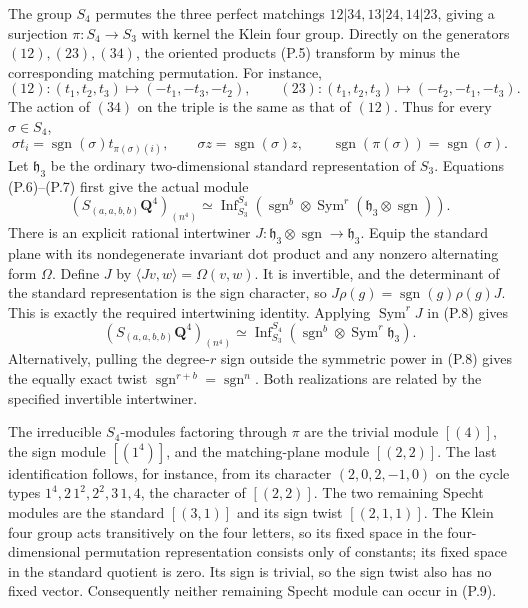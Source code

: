 \documentclass[
  10pt,
]{article}
\begin{document}
The group \(S_4\) permutes the three perfect matchings
\(12|34,13|24,14|23\), giving a surjection \(\pi:S_4\to S_3\) with
kernel the Klein four group. Directly on the generators
\((12),(23),(34)\), the oriented products (P.5) transform by minus the
corresponding matching permutation. For instance, \[
(12):(t_1,t_2,t_3)\longmapsto(-t_1,-t_3,-t_2),
\qquad
(23):(t_1,t_2,t_3)\longmapsto(-t_2,-t_1,-t_3).
\] The action of \((34)\) on the triple is the same as that of \((12)\).
Thus for every \(\sigma\in S_4\), \[
\sigma t_i=\operatorname{sgn}(\sigma)t_{\pi(\sigma)(i)},
\qquad \sigma z=\operatorname{sgn}(\sigma)z,
\qquad\operatorname{sgn}(\pi(\sigma))=\operatorname{sgn}(\sigma).
\tag{P.7}
\] Let \(\mathfrak h_3\) be the ordinary two-dimensional standard
representation of \(S_3\). Equations (P.6)--(P.7) first give the actual
module \[
(S_{(a,a,b,b)}\mathbf Q^4)_{(n^4)}
\simeq\operatorname{Inf}_{S_3}^{S_4}
\left(\operatorname{sgn}^{b}\otimes
\operatorname{Sym}^{r}(\mathfrak h_3\otimes\operatorname{sgn})\right).
\tag{P.8}
\] There is an explicit rational intertwiner
\(J:\mathfrak h_3\otimes\operatorname{sgn}\to\mathfrak h_3\). Equip the
standard plane with its nondegenerate invariant dot product and any
nonzero alternating form \(\Omega\). Define \(J\) by
\(\langle Jv,w\rangle=\Omega(v,w)\). It is invertible, and the
determinant of the standard representation is the sign character, so
\(J\rho(g)=\operatorname{sgn}(g)\rho(g)J\). This is exactly the required
intertwining identity. Applying \(\operatorname{Sym}^rJ\) in (P.8) gives
\[
\boxed{
(S_{(a,a,b,b)}\mathbf Q^4)_{(n^4)}
\simeq\operatorname{Inf}_{S_3}^{S_4}
(\operatorname{sgn}^{b}\otimes\operatorname{Sym}^{r}\mathfrak h_3).}
\tag{P.9}
\] Alternatively, pulling the degree-\(r\) sign outside the symmetric
power in (P.8) gives the equally exact twist
\(\operatorname{sgn}^{r+b}=\operatorname{sgn}^{n}\). Both realizations
are related by the specified invertible intertwiner.

The irreducible \(S_4\)-modules factoring through \(\pi\) are the
trivial module \([(4)]\), the sign module \([(1^4)]\), and the
matching-plane module \([(2,2)]\). The last identification follows, for
instance, from its character \((2,0,2,-1,0)\) on the cycle types
\(1^4,2\,1^2,2^2,3\,1,4\), the character of \([(2,2)]\). The two
remaining Specht modules are the standard \([(3,1)]\) and its sign twist
\([(2,1,1)]\). The Klein four group acts transitively on the four
letters, so its fixed space in the four-dimensional permutation
representation consists only of constants; its fixed space in the
standard quotient is zero. Its sign is trivial, so the sign twist also
has no fixed vector. Consequently neither remaining Specht module can
occur in (P.9).
\end{document}
